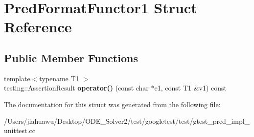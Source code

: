\hypertarget{struct_pred_format_functor1}{}\section{Pred\+Format\+Functor1 Struct Reference}
\label{struct_pred_format_functor1}
\subsection*{Public Member Functions}
\begin{DoxyCompactItemize}
\item 
\mbox{\label{struct_pred_format_functor1_ac2c414b5fa65b41b0ab5967f9f1e5bff}} 
{\footnotesize template$<$typename T1 $>$ }\\testing\+::\+Assertion\+Result {\bfseries operator()} (const char $\ast$e1, const T1 \&v1) const
\end{DoxyCompactItemize}


The documentation for this struct was generated from the following file\+:\begin{DoxyCompactItemize}
\item 
/\+Users/jiahuawu/\+Desktop/\+O\+D\+E\+\_\+\+Solver2/test/googletest/test/gtest\+\_\+pred\+\_\+impl\+\_\+unittest.\+cc\end{DoxyCompactItemize}
